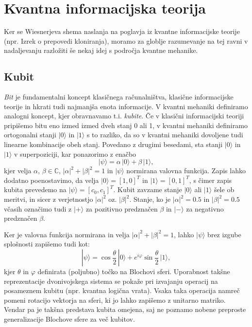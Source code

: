 \documentclass[12pt]{article}
\begin{document}
\section{Kvantna informacijska teorija}
\par Ker se Wiesnerjeva shema naslanja na poglavja iz kvantne informacijske teorije (npr. Izrek o prepovedi kloniranja), moramo za globlje razumevanje na tej ravni v nadaljevanju razložiti še nekaj idej s področja kvantne mehanike.

\subsection{Kubit}
\label{kubit} 

\emph{Bit} je fundamentalni koncept klasičnega računalništva, klasične informacijske teorije in hkrati tudi najmanjša enota informacije. V kvantni mehaniki definiramo analogni koncept, kjer obravnavamo t.i. \emph{kubite}. Če v klasični informacijski teoriji pripišemo bitu eno izmed izmed dveh stanj 0 ali 1, v kvantni mehaniki definiramo ortogonalni stanji $| 0 \rangle$ in $| 1 \rangle$ s to razliko, da so v kvantni mehaniki dovoljene tudi linearne kombinacije obeh stanj. Povedano z drugimi besedami, sta stanji $| 0 \rangle$ in $| 1 \rangle$ v superpoziciji, kar ponazorimo z enačbo
%
\begin{equation}
| \psi \rangle = \alpha \, | 0 \rangle + \beta \, | 1 \rangle,
\end{equation}
%
kjer velja $\alpha$, $\beta \in \mathbb{C}$, $|\alpha|^2 + |\beta|^2 = 1$ in $| \psi \rangle$ normirana valovna funkcija. Zapis lahko dodatno poenostavimo, da velja $| 0 \rangle = [1,0]^T$ in $| 1 \rangle = [0,1]^T$, s čimer zapis kubita prevedemo na $| \psi \rangle = [c_0, c_1]^T$.  Kubit zavzame stanje $| 0 \rangle$ ali $| 1 \rangle$ šele ob meritvi, in sicer z verjetnostjo $|\alpha|^2$ oz. $|\beta|^2$. Stanje, ko je $|\alpha|^2 = 0.5$ in $|\beta|^2 = 0.5$ včasih označimo tudi z $| + \rangle$ za pozitivno predznačen $\beta$ in $| - \rangle$ za negativno predznačen $\beta$. \cite{nielsenQuantumComputationQuantum2012} \par Ker je valovna funkcija normirana in velja $|\alpha|^2 + |\beta|^2 = 1$, lahko $| \psi \rangle$ brez izgube splošnosti zapišemo tudi kot:
\begin{equation}
\label{blocheq}
| \psi \rangle = \cos{\frac{\theta}{2}} \, | 0 \rangle + e^{i \varphi} \sin{\frac{\theta}{2}} \, | 1 \rangle,
\end{equation}
kjer $\theta$ in $\varphi$ definirata (poljubno) točko na Blochovi sferi. Uporabnost takšne reprezentacije dvonivojskega sistema se pokaže pri izvajanju operacij na posameznem kubitu (npr. kvantna logična vrata). Vsaka taka operacija namreč pomeni rotacijo vektorja na sferi, ki jo lahko zapišemo z unitarno matriko. Vendar pa je takšna predstava kubita omejena, saj ne poznamo nobene preproste generalizacije Blochove sfere za več kubitov. \cite{nielsenQuantumComputationQuantum2012}
\end{document}
